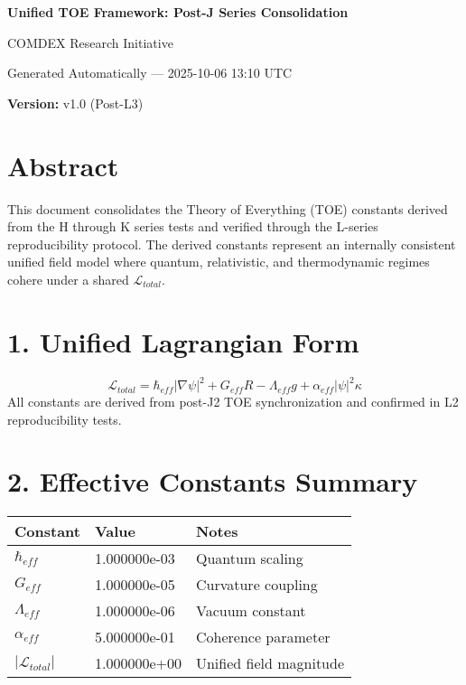 \documentclass[12pt,a4paper]{article}
\begin{document}
\begin{titlepage}
\centering
\vspace*{2cm}
{\LARGE\bfseries Unified TOE Framework: Post-J Series Consolidation \par}
\vspace{1cm}
{\large COMDEX Research Initiative \par}
\vspace{1cm}
{\large Generated Automatically — 2025-10-06 13:10 UTC \par}
\vfill
{\large \textbf{Version:} v1.0 (Post-L3)}
\end{titlepage}

\section*{Abstract}
This document consolidates the Theory of Everything (TOE) constants derived from
the H through K series tests and verified through the L-series reproducibility protocol.
The derived constants represent an internally consistent unified field model where
quantum, relativistic, and thermodynamic regimes cohere under a shared $\mathcal{L}_{total}$.

\section*{1. Unified Lagrangian Form}
\[
\mathcal{L}_{total} =
\hbar_{eff} |\nabla \psi|^2 + G_{eff} R - \Lambda_{eff} g + \alpha_{eff} |\psi|^2 \kappa
\]
All constants are derived from post-J2 TOE synchronization and confirmed in L2 reproducibility tests.

\section*{2. Effective Constants Summary}
\begin{tabular}{lll}
\toprule
\textbf{Constant} & \textbf{Value} & \textbf{Notes} \\
\midrule
$\hbar_{eff}$ & 1.000000e-03 & Quantum scaling \\
$G_{eff}$ & 1.000000e-05 & Curvature coupling \\
$\Lambda_{eff}$ & 1.000000e-06 & Vacuum constant \\
$\alpha_{eff}$ & 5.000000e-01 & Coherence parameter \\
$|\mathcal{L}_{total}|$ & 1.000000e+00 & Unified field magnitude \\
\bottomrule
\end{tabular}
\end{document}
